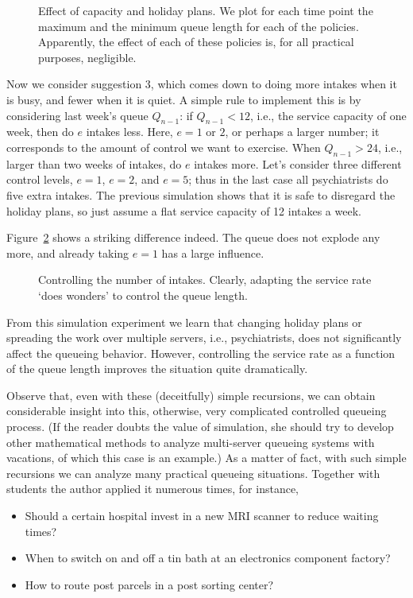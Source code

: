 \begin{figure}[ht]
  \centering
 
\caption{Effect of capacity and holiday plans. We plot for each time point
  the maximum and the minimum queue length for each of the
  policies. Apparently, the effect of each of these policies is, for
  all practical purposes, negligible.  }
\label{fig:balanced}
\end{figure}


Now we consider suggestion 3, which comes down to doing more intakes
when it is busy, and fewer when it is quiet. A simple rule to
implement this is by considering last week's queue $Q_{n-1}$: if
$Q_{n-1}<12$, i.e., the service capacity of one week, then do $e$
intakes less. Here, $e=1$ or $2$, or perhaps a larger number; it
corresponds to the amount of control we want to exercise. When
$Q_{n-1}>24$, i.e., larger than two weeks of intakes, do $e$ intakes
more. Let's consider three different control levels, $e=1$, $e=2$, and
$e=5$; thus in the last case all psychiatrists do five extra intakes.
The previous simulation shows that it is safe to disregard the holiday
plans, so just assume a flat service capacity of 12 intakes a week.

Figure~\ref{fig:intakes} shows a striking difference indeed. The queue
does not explode any more, and already taking $e=1$ has a large
influence. 

\begin{figure}[ht]
  \centering
  
\caption{Controlling the number of intakes. Clearly, adapting the
  service rate `does wonders' to control the queue length.}
\label{fig:intakes}
\end{figure}

From this simulation experiment we learn that changing holiday plans or
spreading the work over multiple servers, i.e., psychiatrists, does
not significantly affect the queueing behavior.  However, controlling
the service rate as a function of the queue length improves the
situation quite dramatically. 


Observe that, even with these (deceitfully) simple recursions, we can obtain
considerable insight into this, otherwise, very complicated controlled
queueing process. (If the reader doubts the value of simulation, she
should try to develop other mathematical methods to analyze
multi-server queueing systems with vacations, of which this case is an
example.) As a matter of fact, with such simple recursions we can analyze many practical queueing
situations. Together with students the author applied it numerous
times, for instance,
\begin{itemize}
\item Should a certain hospital invest in a new MRI scanner to reduce
  waiting times?
\item When to switch on and off a tin bath at an electronics component factory?
\item How to route post parcels in a post sorting center?
\end{itemize}

